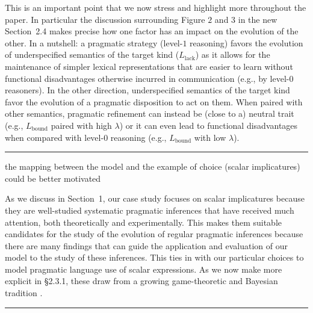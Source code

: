 \documentclass[12pt,a4paper]{article}
\begin{document}
This is an important point that we now stress and highlight more throughout the paper. In particular the discussion surrounding Figure $2$ and $3$ in the new Section~2.4 makes precise how one factor has an impact on the evolution of the other. In a nutshell: a pragmatic strategy (level-$1$ reasoning) favors the evolution of underspecified semantics of the target kind ($L_{\text{lack}}$) as it allows for the maintenance of simpler lexical representations that are easier to learn without functional disadvantages otherwise incurred in communication (e.g., by level-$0$ reasoners). In the other direction, underspecified semantics of the target kind favor the evolution of a pragmatic disposition to act on them. When paired with other semantics, pragmatic refinement can instead be (close to a) neutral trait (e.g., $L_{\text{bound}}$ paired with high $\lambda$) or it can even lead to  functional disadvantages when compared with level-$0$ reasoning (e.g., $L_{\text{bound}}$ with low $\lambda$). 

%

\vspace{.75cm}
\noindent\rule{\textwidth}{1pt}

\begin{mdframed}[backgroundcolor=gray!25,linecolor=gray!25,frametitle= Reviewer \thereviewerCounter~comment \thereviewerCommentCounter \hfill ~~({\it modeling choices})]
the mapping between the model and the example of choice (scalar implicatures) could be better motivated
\end{mdframed}

As we discuss in Section~1, our case study focuses on scalar implicatures because they are well-studied systematic pragmatic inferences that have received much attention, both theoretically and experimentally. This makes them suitable candidates for the study of the evolution of regular pragmatic inferences because there are many findings that can guide the application and evaluation of our model to the study of these inferences. This ties in with our particular choices to model pragmatic language use of scalar expressions. As we now make more explicit in \S 2.3.1, these draw from a growing game-theoretic and Bayesian tradition \citep[e.g.,][]{franke:2009,FrankeJager2015:Probabilistic-p,GoodmanFrank2016:Pragmatic-Langu}. 

%
\vspace{.75cm}
\noindent\rule{\textwidth}{1pt}
\vspace{.1cm}
\end{document}
